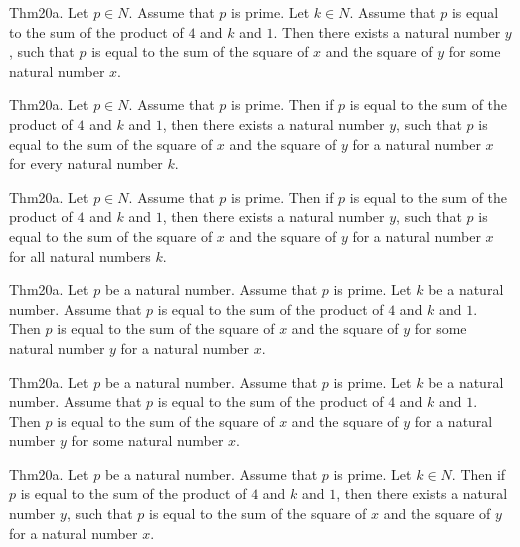 \documentclass{article}
\begin{document}
Thm20a. Let $p \in N$. Assume that $p$ is prime. Let $k \in N$. Assume that $p$ is equal to the sum of the product of $4$ and $k$ and $1$. Then there exists a natural number $y$, such that $p$ is equal to the sum of the square of $x$ and the square of $y$ for some natural number $x$.

Thm20a. Let $p \in N$. Assume that $p$ is prime. Then if $p$ is equal to the sum of the product of $4$ and $k$ and $1$, then there exists a natural number $y$, such that $p$ is equal to the sum of the square of $x$ and the square of $y$ for a natural number $x$ for every natural number $k$.

Thm20a. Let $p \in N$. Assume that $p$ is prime. Then if $p$ is equal to the sum of the product of $4$ and $k$ and $1$, then there exists a natural number $y$, such that $p$ is equal to the sum of the square of $x$ and the square of $y$ for a natural number $x$ for all natural numbers $k$.

Thm20a. Let $p$ be a natural number. Assume that $p$ is prime. Let $k$ be a natural number. Assume that $p$ is equal to the sum of the product of $4$ and $k$ and $1$. Then $p$ is equal to the sum of the square of $x$ and the square of $y$ for some natural number $y$ for a natural number $x$.

Thm20a. Let $p$ be a natural number. Assume that $p$ is prime. Let $k$ be a natural number. Assume that $p$ is equal to the sum of the product of $4$ and $k$ and $1$. Then $p$ is equal to the sum of the square of $x$ and the square of $y$ for a natural number $y$ for some natural number $x$.

Thm20a. Let $p$ be a natural number. Assume that $p$ is prime. Let $k \in N$. Then if $p$ is equal to the sum of the product of $4$ and $k$ and $1$, then there exists a natural number $y$, such that $p$ is equal to the sum of the square of $x$ and the square of $y$ for a natural number $x$.
\end{document}
